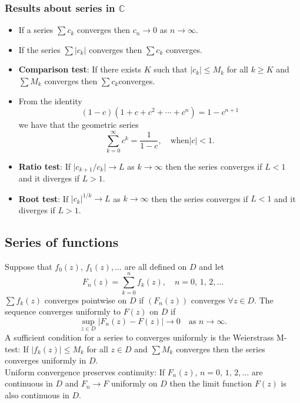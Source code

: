 \documentclass{article}
\begin{document}
\subsubsection{Results about series in $\mathbb{C}$}
\begin{itemize}
    \item If a series $\sum c_k$ converges then $c_n\to 0$ as $n\to \infty$.
    \item If the series $\sum\vert c_k\vert$ converges then $\sum c_k$ converges.
    \item \textbf{Comparison test}: If there exists $K$ such that $\vert c_k\vert\leq M_k$ for all $k\geq K$ and $\sum M_k$ converges then $\sum c_k$converges.
    \item From the identity
    \begin{equation}
        (1-c)(1+c+c^2+\cdots+c^n) = 1-c^{n+1}
    \end{equation}
    we have that the geometric series
    \begin{equation}
        \sum_{k=0}^\infty c^k = \frac{1}{1-c},\quad \text{when} \vert c\vert<1.
    \end{equation}
    \item \textbf{Ratio test}: If $\vert c_{k+1}/c_k\vert\to L$ as $k\to\infty$ then the series converges if $L<1$ and it diverges if $L>1$.
    \item \textbf{Root test}: If $\vert c_k\vert ^{1/k}\to L$ as $k\to\infty$ then the series converges if $L<1$ and it diverges if $L>1$. 
\end{itemize}


\subsection{Series of functions}
Suppose that $f_0(z),\,f_1(z),\ldots$ are all defined on $D$ and let 
\begin{equation}
    F_n(z) = \sum_{k=0}^n f_k(z),\quad n=0,\,1,\,2,\ldots
\end{equation}
$\sum f_k(z)$ converges pointwise on $D$ if $(F_n(z))$ converges $\forall z\in D$. The sequence converges uniformly to $F(z)$ on $D$ if
\begin{equation}
    \sup_{z\in D}\vert F_n(z) - F(z)\vert \to 0\quad\text{as }n\to\infty.
\end{equation}
A sufficient condition for a series to converges uniformly is the Weierstrass M-test: If $\vert f_k(z)\vert\leq M_k$ for all $z\in D$ and $\sum M_k$ converges then the series converges uniformly in $D$.\\
Uniform convergence preserves continuity: If $F_n(z)$, $n = 0,\,1,\,2,\ldots$ are continuous in $D$ and $F_n\to F$ uniformly on $D$ then the limit function $F(z)$ is also continuous in $D$.
\end{document}
